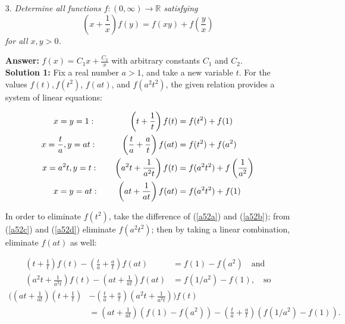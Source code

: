 \documentclass[a4paper, 12pt]{article}
\begin{document}
\begin{enumerate}
\item[3.]  \textit{Determine all functions $f : \left(0,\infty\right) \to \mathbb{R}$ satisfying
\begin{equation} \label{a51}
    \left(x+\frac{1}{x}\right) f(y) = f\left(xy\right) +f\left(\frac{y}{x}\right)
\end{equation} 
for all $x,y > 0$. 
}
 \vspace{5mm}

\textbf{Answer: } $f(x) = C_1 x + \frac{C_2}{x}$ with arbitrary constants $C_1$ and $C_2$. \\

\textbf{Solution 1: } Fix a real number $a > 1$, and take a new variable $t$. For the values $f(t), f(t^2)$, $f(at)$, and $f(a^2 t^2)$, the given relation provides a system of linear equations:

\begin{align}
    x = y = 1: \hspace{7.4mm} \qquad \left(t + \frac{1}{t} \right) f(t) &= f(t^2) + f(1) \label{a52a} \\
    x = \frac{t}{a}, y = at:  \hspace{3.5mm} \qquad \left( \frac{t}{a} + \frac{a}{t} \right)  f(at) &= f(t^2) + f(a^2) \label{a52b} \\
    x = a^2t, y = t:  \qquad  \left( a^2t + \frac{1}{a^2t}  \right) f(t) &= f(a^2t^2) + f\left( \frac{1}{a^2}  \right) \label{a52c} \\
    x = y = at: \hspace{1mm} \qquad \left( at + \frac{1}{at}  \right) f(at) &= f(a^2 t^2) + f(1) \label{a52d}
\end{align}

In order to eliminate $f(t^2)$, take the difference of (\ref{a52a}) and (\ref{a52b}); from (\ref{a52c}) and (\ref{a52d}) eliminate $f(a^2 t^2)$; then by taking a linear combination, eliminate $f(at)$ as well:

\begin{align*}
    \left(t + \frac{1}{t} \right) f(t) - \left(\frac{t}{a} + \frac{a}{t} \right) f(at) &= f(1) - f(a^2) \quad \textrm{and} \\
    \left(a^2 t + \frac{1}{a^2 t} \right) f(t)  - \left(at + \frac{1}{at} \right) f(at) &= f(1/a^2) - f(1), \quad \textrm{so} 
\end{align*}
\begin{align*}
    ( \left(at + \frac{1}{at} \right) \left(t + \frac{1}{t} \right) &- \left(\frac{t}{a} + \frac{a}{t} \right) \left(a^2t + \frac{1}{a^2 t} \right) ) f(t) \\
    &= \left(at + \frac{1}{at} \right) (f(1) - f(a^2)) - \left(\frac{t}{a} + \frac{a}{t} \right) (f(1/a^2) - f(1)).
\end{align*}


\end{enumerate}
\end{document}
